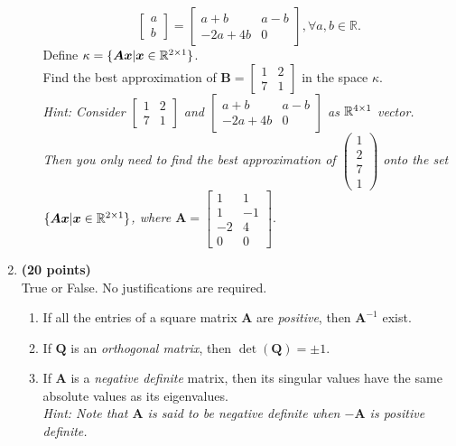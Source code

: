 \begin{enumerate}
\begin{enumerate}
\[\begin{bmatrix}
a\\b
\end{bmatrix}=\begin{bmatrix}
a+b&a-b\\-2a+4b&0
\end{bmatrix},\forall a,b\in\mathbb{R}.
\]
Define $\kappa=\{\bm{Ax}|\bm x\in\mathbb{R}^{2\times 1}\}$.\\
Find the best approximation of $\bm B=\begin{bmatrix}
1&2\\7&1
\end{bmatrix}$ in the space $\kappa$.\\
\textit{Hint: Consider $\begin{bmatrix}
1&2\\7&1
\end{bmatrix}$ and $\begin{bmatrix}
a+b&a-b\\-2a+4b&0
\end{bmatrix}$ as $\mathbb{R}^{4\times 1}$ vector.\\
Then you only need to find the best approximation of $\begin{pmatrix}
1\\2\\7\\1
\end{pmatrix}$ onto the set $\{\bm{Ax}|\bm x\in\mathbb{R}^{2\times 1}\}$, where $\bm A=\begin{bmatrix}
1&1\\1&-1\\-2&4\\0&0
\end{bmatrix}.$}
\end{enumerate}
\newpage
\item \textbf{(20 points)} \\
True or False. No justifications are required.
\begin{enumerate}
\item
If all the entries of a square matrix $\bm A$ are \textit{positive}, then $\bm A^{-1}$ exist.\\
\item
If $\bm Q$ is an \textit{orthogonal matrix}, then $\det(\bm Q)=\pm1$.\\
\item
If $\bm A$ is a \textit{negative definite} matrix, then its singular values have the same absolute values as its eigenvalues.\\
\textit{Hint: Note that $\bm A$ is said to be negative definite when $-\bm A$ is positive definite.}\\

\end{enumerate}
\end{enumerate}
